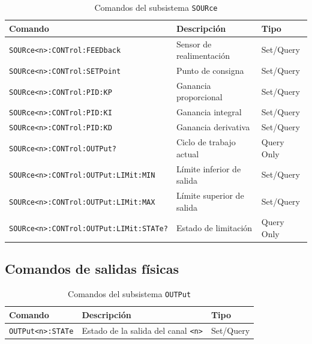 \begin{table}[H]

    \caption{Comandos del subsistema \texttt{SOURce}}
    \label{tab:sour-group}
    \begin{tabular}{lll}
        \toprule
        \textbf{Comando} & \textbf{Descripción} & \textbf{Tipo} \\
        \midrule
        \texttt{SOURce<n>:CONTrol:FEEDback}          & Sensor de realimentación          & Set/Query \\
        \texttt{SOURce<n>:CONTrol:SETPoint}          & Punto de consigna                 & Set/Query \\
        \texttt{SOURce<n>:CONTrol:PID:KP}            & Ganancia proporcional             & Set/Query \\
        \texttt{SOURce<n>:CONTrol:PID:KI}            & Ganancia integral                 & Set/Query \\
        \texttt{SOURce<n>:CONTrol:PID:KD}            & Ganancia derivativa               & Set/Query \\
        \texttt{SOURce<n>:CONTrol:OUTPut?}           & Ciclo de trabajo actual           & Query Only \\
        \texttt{SOURce<n>:CONTrol:OUTPut:LIMit:MIN}  & Límite inferior de salida         & Set/Query \\
        \texttt{SOURce<n>:CONTrol:OUTPut:LIMit:MAX}  & Límite superior de salida         & Set/Query \\
        \texttt{SOURce<n>:CONTrol:OUTPut:LIMit:STATe?}& Estado de limitación             & Query Only \\
        \bottomrule
    \end{tabular}
\end{table}

\subsection*{Comandos de salidas físicas}

\begin{table}[H]

    \caption{Comandos del subsistema \texttt{OUTPut}}
    \label{tab:outp-group}
    \begin{tabular}{lll}
        \toprule
        \textbf{Comando} & \textbf{Descripción} & \textbf{Tipo} \\
        \midrule
        \texttt{OUTPut<n>:STATe} & Estado de la salida del canal \texttt{<n>} & Set/Query \\
        \bottomrule
    \end{tabular}
\end{table}

